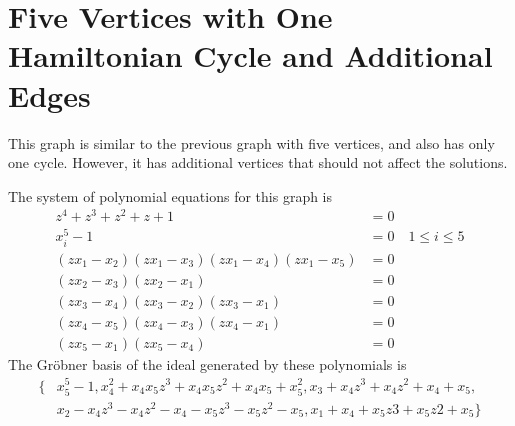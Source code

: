 \documentclass[letterpaper]{article}
\newcommand{\aln}[1]{\begin{align*} #1 \end{align*}} %
\begin{document}
\newpage

\section{Five Vertices with One Hamiltonian Cycle and Additional Edges}
This graph is similar to the previous graph with five vertices, and also has only one cycle. However, it has additional vertices that should not affect the solutions.
\begin{center}
\end{center}
The system of polynomial equations for this graph is
\aln{
  z^4 + z^3 + z^2 + z + 1 &= 0\\
  x_i^5 - 1 &= 0 \quad 1 \leq i \leq 5\\
  (z x_1 - x_2) (z x_1 - x_3) (z x_1 - x_4) (z x_1 - x_5) &= 0\\
  (z x_2 - x_3) (z x_2 - x_1) &= 0\\
  (z x_3 - x_4) (z x_3 - x_2) (z x_3 - x_1) &= 0\\
  (z x_4 - x_5) (z x_4 - x_3) (z x_4 - x_1) &= 0\\
  (z x_5 - x_1) (z x_5 - x_4) &= 0
}
The Gr\"obner basis of the ideal generated by these polynomials is
\aln{
 \{&x_5^5-1, x_4^2+x_4x_5z^3+x_4x_5z^2+x_4x_5+x_5^2, x_3+x_4z^3+x_4z^2+x_4+x_5,\\& x_2-x_4z^3-x_4z^2-x_4-x_5z^3-x_5z^2-x_5, x_1+x_4+x_5z3+x_5z2+x_5\}
}

\newpage
\end{document}
